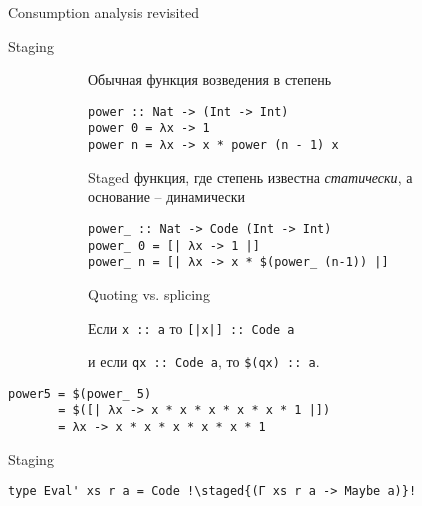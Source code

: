 \documentclass[aspectratio=169
  , xcolor={svgnames}
  , hyperref={ colorlinks,citecolor=Blue
             , linkcolor=DarkRed,urlcolor=DarkBlue}
  , russian
  ]{beamer}
\newcommand{\staged}[1]{{\colorbox{light-gray}{#1}}}
\begin{document}
\begin{frame}{Consumption analysis revisited}

\end{frame}


\begin{frame}[fragile]{Staging}
\begin{figure}[ht]
\begin{subfigure}[t]{.59\textwidth}
Обычная функция возведения в степень
\begin{verbatim}
power :: Nat -> (Int -> Int)
power 0 = λx -> 1
power n = λx -> x * power (n - 1) x
\end{verbatim}
Staged функция, где степень известна \emph{статически}, а основание -- динамически
\begin{verbatim}
power_ :: Nat -> Code (Int -> Int)
power_ 0 = [| λx -> 1 |]
power_ n = [| λx -> x * $(power_ (n-1)) |]
\end{verbatim}
\end{subfigure}
\hspace{.1\textwidth}
\begin{subfigure}[t]{.29\textwidth}
Quoting vs. splicing 
\vspace{1em}

Если \verb=x :: a= то \verb=[|x|] :: Code a= 
\vspace{1em}

и если  \verb=qx :: Code a=, то \verb=$(qx) :: a=.

\end{subfigure}
\end{figure}
\begin{center}
\begin{minipage}{10cm}
\begin{verbatim}
power5 = $(power_ 5)
       = $([| λx -> x * x * x * x * x * 1 |])
       = λx -> x * x * x * x * x * 1
\end{verbatim}
\end{minipage}
\end{center}
\end{frame}


\begin{frame}[fragile]{Staging}



\begin{verbatim}
type Eval' xs r a = Code !\staged{(Γ xs r a -> Maybe a)}!
\end{verbatim}

\end{frame}
\end{document}
